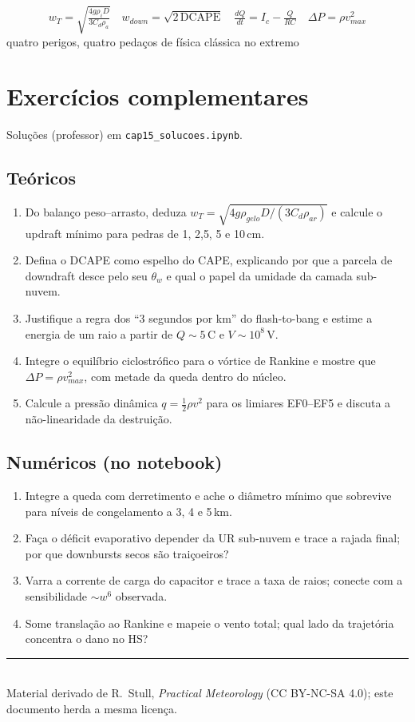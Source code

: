 \documentclass[11pt]{article}
\begin{document}
\begin{noquadro}
\[ w_T = \sqrt{\tfrac{4g\rho_i D}{3C_d\rho_a}} \quad
w_{down} = \sqrt{2\,\mathrm{DCAPE}} \quad
\tfrac{dQ}{dt} = I_c - \tfrac{Q}{RC} \quad
\Delta P = \rho v_{max}^2 \]
quatro perigos, quatro pedaços de física clássica no extremo
\end{noquadro}

\section{Exercícios complementares}\label{sec:exercicios}

Soluções (professor) em \texttt{cap15\_solucoes.ipynb}.

\subsection*{Teóricos}

\begin{enumerate}[label=\textbf{T\arabic*.},itemsep=4pt]
  \item Do balanço peso--arrasto, deduza
        $w_T = \sqrt{4g\rho_{gelo}D/(3C_d\rho_{ar})}$ e calcule o
        updraft mínimo para pedras de 1, 2{,}5, 5 e 10\,cm.
  \item Defina o DCAPE como espelho do CAPE, explicando por que a
        parcela de downdraft desce pelo seu $\theta_w$ e qual o papel
        da umidade da camada sub-nuvem.
  \item Justifique a regra dos ``3 segundos por km'' do flash-to-bang
        e estime a energia de um raio a partir de $Q \sim 5$\,C e
        $V \sim 10^8$\,V.
  \item Integre o equilíbrio ciclostrófico para o vórtice de Rankine e
        mostre que $\Delta P = \rho v_{max}^2$, com metade da queda
        dentro do núcleo.
  \item Calcule a pressão dinâmica $q = \tfrac12\rho v^2$ para os
        limiares EF0--EF5 e discuta a não-linearidade da destruição.
\end{enumerate}

\subsection*{Numéricos (no notebook)}

\begin{enumerate}[label=\textbf{N\arabic*.},itemsep=4pt]
  \item Integre a queda com derretimento e ache o diâmetro mínimo que
        sobrevive para níveis de congelamento a 3, 4 e 5\,km.
  \item Faça o déficit evaporativo depender da UR sub-nuvem e trace a
        rajada final; por que downbursts secos são traiçoeiros?
  \item Varra a corrente de carga do capacitor e trace a taxa de
        raios; conecte com a sensibilidade $\sim w^6$ observada.
  \item Some translação ao Rankine e mapeie o vento total; qual lado
        da trajetória concentra o dano no HS?
\end{enumerate}

\vspace{1em}
\noindent\rule{\linewidth}{0.4pt}\\
{\scriptsize Material derivado de R.~Stull, \emph{Practical Meteorology}
(CC BY-NC-SA 4.0); este documento herda a mesma licença.}
\end{document}
